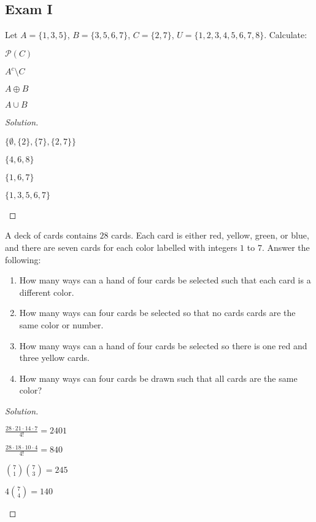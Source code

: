 \documentclass[crop=false,class=book,oneside]{standalone}
\begin{document}
\subsection{Exam I}
\begin{problem}
Let $A = \{1,3,5\}$, $B = \{3,5,6,7\}$, $C = \{2,7\}$, $U = \{1,2,3,4,5,6,7,8\}$. Calculate:
\begin{enumerate}
\begin{multicols}{4}
    \item $\mathcal{P}(C)$
    \item $A^c \setminus C$
    \item $A\oplus B$
    \item $A\cup B$
\end{multicols}
\end{enumerate}
\end{problem}
\begin{proof}[Solution]
\vspace{-\topsep}
\
\begin{enumerate}
\begin{multicols}{4}
    \item $\big\{\emptyset, \{2\}, \{7\}, \{2,7\}\big\}$
    \item $\{4,6,8\}$
    \item $\{1,6,7\}$
    \item $\{1,3,5,6,7\}$
\end{multicols}
\end{enumerate}
\end{proof}
\begin{problem}
A deck of cards contains $28$ cards. Each card is either red, yellow, green, or blue, and there are seven cards for each color labelled with integers $1$ to $7$. Answer the following:
\begin{enumerate}
    \item How many ways can a hand of four cards be selected such that each card is a different color.
    \item How many ways can four cards be selected so that no cards cards are the same color or number.
    \item How many ways can a hand of four cards be selected so there is one red and three yellow cards. 
    \item How many ways can four cards be drawn such that all cards are the same color?
\end{enumerate}
\end{problem}
\begin{proof}[Solution]
\vspace{-\topsep}
\
\begin{enumerate}
\end{enumerate}
\end{proof}
\end{document}
